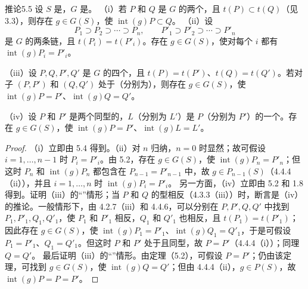 \begin{SGAresult}{推论}{5.5}
设 $S$ 是，$G$ 是。
（i）若 $P$ 和 $Q$ 是 $G$ 的两个，且 $t(P)\subset t(Q)$（见 3.3），则存在 $g\in G(S)$，使 $\operatorname{int}(g)P\subset Q$。
（ii）设
\[
 P_1\supset P_2\supset\cdots\supset P_n,\qquad
 P'_1\supset P'_2\supset\cdots\supset P'_n
\]
是 $G$ 的两条链，且 $t(P_i)=t(P'_i)$。存在 $g\in G(S)$，使对每个 $i$ 都有 $\operatorname{int}(g)P_i=P'_i$。

（iii）设 $P,Q,P',Q'$ 是 $G$ 的四个，且 $t(P)=t(P')$、$t(Q)=t(Q')$。若对子 $(P,P')$ 和 $(Q,Q')$ 处于（分别为），则存在 $g\in G(S)$，使 $\operatorname{int}(g)P=P'$、$\operatorname{int}(g)Q=Q'$。

（iv）设 $P$ 和 $P'$ 是两个同型的，$L$（分别为 $L'$）是 $P$（分别为 $P'$）的一个。存在 $g\in G(S)$，使 $\operatorname{int}(g)P=P'$、$\operatorname{int}(g)L=L'$。
\end{SGAresult}
\begin{proof}
（i）立即由 5.4 得到。（ii）对 $n$ 归纳，$n=0$ 时显然；故可假设 $i=1,\ldots,n-1$ 时 $P_i=P'_i$。由 5.2，存在 $g\in G(S)$，使 $\operatorname{int}(g)P_n=P'_n$；但这时 $P_n$ 和 $\operatorname{int}(g)P_n$ 都包含在 $P_{n-1}=P'_{n-1}$ 中，故 $g\in P_{n-1}(S)$（4.4.4（ii）），并且 $i=1,\ldots,n$ 时 $\operatorname{int}(g)P_i=P'_i$。
另一方面，（iv）立即由 5.2 和 1.8 得到。证明（iii）的“”情形；当 $P$ 和 $Q$ 的型相反（4.3.3（iii））时，断言是（iv）的推论。一般情形下，由 4.2.7（iii）和 4.4.6，可以分别在 $P,P',Q,Q'$ 中找到 $P_1,P'_1,Q_1,Q'_1$，使 $P_1$ 和 $P'_1$ 相反，$Q_1$ 和 $Q'_1$ 也相反，且 $t(P_1)=t(P'_1)$；因此存在 $g\in G(S)$，使 $\operatorname{int}(g)P_1=P'_1$、$\operatorname{int}(g)Q_1=Q'_1$，于是可假设 $P_1=P'_1$、$Q_1=Q'_1$。但这时 $P$ 和 $P'$ 处于且同型，故 $P=P'$（4.4.4（i））；同理 $Q=Q'$。
最后证明（iii）的“”情形。由定理（5.2），可假设 $P=P'$；仍由该定理，可找到 $g\in G(S)$，使 $\operatorname{int}(g)Q=Q'$；但由 4.4.4（ii），$g\in P(S)$，故 $\operatorname{int}(g)P=P=P'$。
\end{proof}

